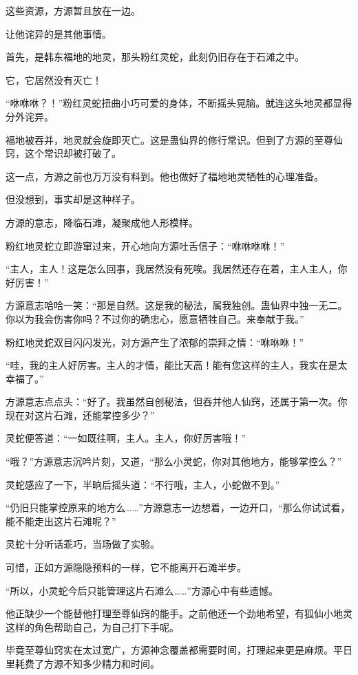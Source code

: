 \begin{this_body}
这些资源，方源暂且放在一边。

让他诧异的是其他事情。

首先，是韩东福地的地灵，那头粉红灵蛇，此刻仍旧存在于石滩之中。

它，它居然没有灭亡！

“咻咻咻？！”粉红灵蛇扭曲小巧可爱的身体，不断摇头晃脑。就连这头地灵都显得分外诧异。

福地被吞并，地灵就会旋即灭亡。这是蛊仙界的修行常识。但到了方源的至尊仙窍，这个常识却被打破了。

这一点，方源之前也万万没有料到。他也做好了福地地灵牺牲的心理准备。

但没想到，事实却是这种样子。

方源的意志，降临石滩，凝聚成他人形模样。

粉红地灵蛇立即游窜过来，开心地向方源吐舌信子：“咻咻咻咻！”

“主人，主人！这是怎么回事，我居然没有死唉。我居然还存在着，主人主人，你好厉害！”

方源意志哈哈一笑：“那是自然。这是我的秘法，属我独创。蛊仙界中独一无二。你以为我会伤害你吗？不过你的确忠心，愿意牺牲自己。来奉献于我。”

粉红地灵蛇双目闪闪发光，对方源产生了浓郁的崇拜之情：“咻咻咻！”

“哇，我的主人好厉害。主人的才情，能比天高！能有您这样的主人，我实在是太幸福了。”

方源意志点点头：“好了。我虽然自创秘法，但吞并他人仙窍，还属于第一次。你现在对这片石滩，还能掌控多少？”

灵蛇便答道：“一如既往啊，主人。主人，你好厉害哦！”

“哦？”方源意志沉吟片刻，又道，“那么小灵蛇，你对其他地方，能够掌控么？”

灵蛇感应了一下，半晌后摇头道：“不行哦，主人，小蛇做不到。”

“仍旧只能掌控原来的地方么……”方源意志一边想着，一边开口，“那么你试试看，能不能走出这片石滩呢？”

灵蛇十分听话乖巧，当场做了实验。

可惜，正如方源隐隐预料的一样，它不能离开石滩半步。

“所以，小灵蛇今后只能管理这片石滩么……”方源心中有些遗憾。

他正缺少一个能替他打理至尊仙窍的能手。之前他还一个劲地希望，有狐仙小地灵这样的角色帮助自己，为自己打下手呢。

毕竟至尊仙窍实在太过宽广，方源神念覆盖都需要时间，打理起来更是麻烦。平日里耗费了方源不知多少精力和时间。


\end{this_body}
